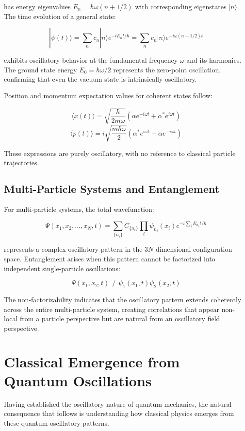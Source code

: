 \documentclass[11pt]{article}
\theoremstyle{remark}
\begin{document}
has energy eigenvalues $E_n = \hbar\omega(n + 1/2)$ with corresponding eigenstates $|n\rangle$. The time evolution of a general state:

$$|\psi(t)\rangle = \sum_n c_n |n\rangle e^{-iE_n t/\hbar} = \sum_n c_n |n\rangle e^{-i\omega(n + 1/2)t}$$

exhibits oscillatory behavior at the fundamental frequency $\omega$ and its harmonics. The ground state energy $E_0 = \hbar\omega/2$ represents the zero-point oscillation, confirming that even the vacuum state is intrinsically oscillatory.

Position and momentum expectation values for coherent states follow:

$$\langle x(t)\rangle = \sqrt{\frac{\hbar}{2m\omega}} (\alpha e^{-i\omega t} + \alpha^* e^{i\omega t})$$
$$\langle p(t)\rangle = i\sqrt{\frac{m\hbar\omega}{2}} (\alpha^* e^{i\omega t} - \alpha e^{-i\omega t})$$

These expressions are purely oscillatory, with no reference to classical particle trajectories.

\subsection{Multi-Particle Systems and Entanglement}

For multi-particle systems, the total wavefunction:

$$\Psi(x_1, x_2, \ldots, x_N, t) = \sum_{\{n_i\}} C_{\{n_i\}} \prod_i \psi_{n_i}(x_i) e^{-i\sum_i E_{n_i} t/\hbar}$$

represents a complex oscillatory pattern in the $3N$-dimensional configuration space. Entanglement arises when this pattern cannot be factorized into independent single-particle oscillations:

$$\Psi(x_1, x_2, t) \neq \psi_1(x_1, t) \psi_2(x_2, t)$$

The non-factorizability indicates that the oscillatory pattern extends coherently across the entire multi-particle system, creating correlations that appear non-local from a particle perspective but are natural from an oscillatory field perspective.

\section{Classical Emergence from Quantum Oscillations}

Having established the oscillatory nature of quantum mechanics, the natural consequence that follows is understanding how classical physics emerges from these quantum oscillatory patterns.
\end{document}
